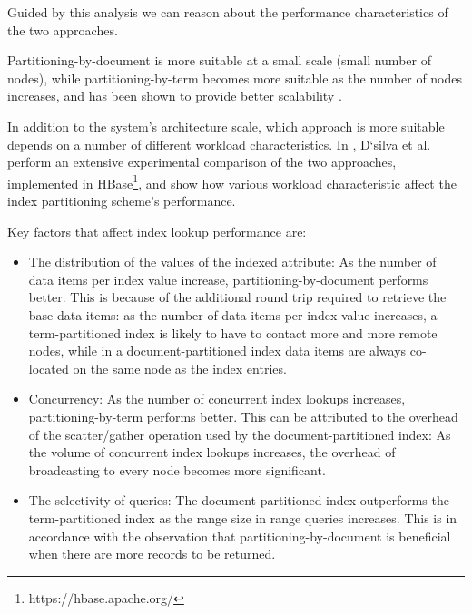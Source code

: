 
Guided by this analysis we can reason about the performance characteristics of the two approaches.

Partitioning-by-document is more suitable at a small scale (small number of nodes),
while partitioning-by-term becomes more suitable as the number of nodes increases,
and has been shown to provide better scalability \cite{kejriwal:slik}.

In addition to the system's architecture scale,
which approach is more suitable depends on a number of different workload characteristics.
In \cite{dsilva:tworings}, D`silva et al. perform an extensive experimental comparison of the two approaches,
implemented in HBase\footnote{https://hbase.apache.org/}, and show how various workload characteristic affect the index partitioning scheme's performance.

Key factors that affect index lookup performance are:
\begin{itemize}

  \item The distribution of the values of the indexed attribute:
  As the number of data items per index value increase, partitioning-by-document performs better.
  This is because of the additional round trip required to retrieve the base data items:
  as the number of data items per index value increases, a term-partitioned index is likely to have to contact
  more and more remote nodes, while in a document-partitioned index data items are always co-located on the same node as
  the index entries.

  \item Concurrency:
  As the number of concurrent index lookups increases, partitioning-by-term performs better.
  This can be attributed to the overhead of the scatter/gather operation used by the document-partitioned index:
  As the volume of concurrent index lookups increases,
  the overhead of broadcasting to every node becomes more significant.

  \item The selectivity of queries:
  The document-partitioned index outperforms the term-partitioned index as the range size in range queries increases.
  This is in accordance with the observation that partitioning-by-document is beneficial when there are
  more records to be returned.

\end{itemize}

